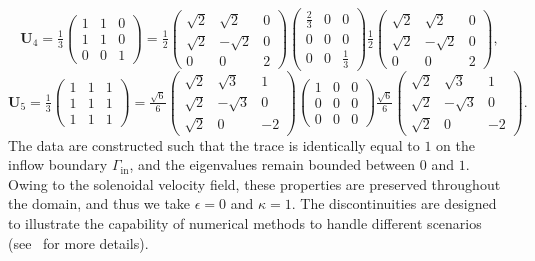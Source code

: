 \documentclass[final,12pt]{amsart}
\theoremstyle{plain}
\theoremstyle{definition}
\begin{document}
\[
\mathbf{U}_4 = \tfrac{1}{3}
\begin{pmatrix}
	1 & 1 & 0 \\
	1 & 1 & 0 \\
	0 & 0 & 1
\end{pmatrix}
= \tfrac{1}{2}
\begin{pmatrix}
	\sqrt{2} & \sqrt{2} & 0 \\
	\sqrt{2} & -\sqrt{2} & 0 \\
	0 & 0 & 2
\end{pmatrix}
\begin{pmatrix}
	\tfrac{2}{3} & 0 & 0 \\
	0 & 0 & 0 \\
	0 & 0 & \tfrac{1}{3}
\end{pmatrix}
\tfrac{1}{2}
\begin{pmatrix}
	\sqrt{2} & \sqrt{2} & 0 \\
	\sqrt{2} & -\sqrt{2} & 0 \\
	0 & 0 & 2
\end{pmatrix},
\]
\[
\mathbf{U}_5 = \tfrac{1}{3}
\begin{pmatrix}
	1 & 1 & 1 \\
	1 & 1 & 1 \\
	1 & 1 & 1
\end{pmatrix}
= \tfrac{\sqrt{6}}{6}
\begin{pmatrix}
	\sqrt{2} & \sqrt{3} & 1 \\
	\sqrt{2} & -\sqrt{3} & 0 \\
	\sqrt{2} & 0 & -2
\end{pmatrix}
\begin{pmatrix}
	1 & 0 & 0 \\
	0 & 0 & 0 \\
	0 & 0 & 0
\end{pmatrix}
\tfrac{\sqrt{6}}{6}
\begin{pmatrix}
	\sqrt{2} & \sqrt{3} & 1 \\
	\sqrt{2} & -\sqrt{3} & 0 \\
	\sqrt{2} & 0 & -2
\end{pmatrix}.
\]
The data are constructed such that the trace is identically equal to $1$ on the inflow boundary $\Gamma_{\text{in}}$, and the eigenvalues remain bounded between $0$ and $1$. Owing to the solenoidal velocity field, these properties are preserved throughout the domain, and thus we take $\epsilon=0$ and $\kappa=1$.
The discontinuities are designed to illustrate the capability of numerical methods to handle different scenarios (see~\cite{lohmann2019algebraic} for more details).
\end{document}

